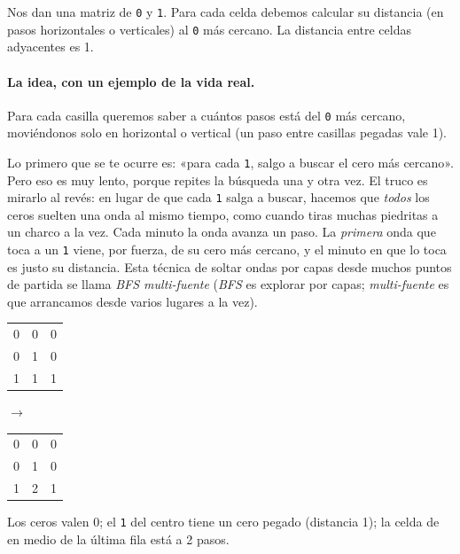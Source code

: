 
Nos dan una matriz de \texttt{0} y \texttt{1}. Para cada celda debemos calcular
su distancia (en pasos horizontales o verticales) al \texttt{0} más cercano.
La distancia entre celdas adyacentes es 1.

\paragraph{La idea, con un ejemplo de la vida real.} Para cada casilla queremos
saber a cuántos pasos está del \texttt{0} más cercano, moviéndonos solo en
horizontal o vertical (un paso entre casillas pegadas vale 1).

Lo primero que se te ocurre es: «para cada \texttt{1}, salgo a buscar el cero
más cercano». Pero eso es muy lento, porque repites la búsqueda una y otra vez.
El truco es mirarlo al revés: en lugar de que cada \texttt{1} salga a buscar,
hacemos que \emph{todos} los ceros suelten una onda al mismo tiempo, como
cuando tiras muchas piedritas a un charco a la vez. Cada minuto la onda avanza
un paso. La \emph{primera} onda que toca a un \texttt{1} viene, por fuerza, de
su cero más cercano, y el minuto en que lo toca es justo su distancia. Esta
técnica de soltar ondas por capas desde muchos puntos de partida se llama
\emph{BFS multi-fuente} (\emph{BFS} es explorar por capas; \emph{multi-fuente}
es que arrancamos desde varios lugares a la vez).

\begin{center}
\ttfamily
\begin{tabular}{ccc}
0 & 0 & 0\\
0 & 1 & 0\\
1 & 1 & 1\\
\end{tabular}
\qquad$\longrightarrow$\qquad
\begin{tabular}{ccc}
0 & 0 & 0\\
0 & 1 & 0\\
1 & 2 & 1\\
\end{tabular}
\end{center}

\noindent Los ceros valen 0; el \texttt{1} del centro tiene un cero pegado
(distancia 1); la celda de en medio de la última fila está a 2 pasos.

